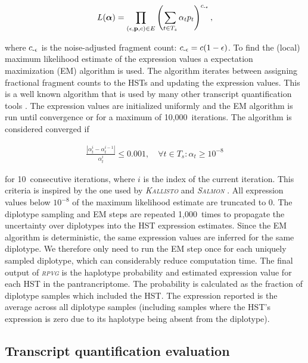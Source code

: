 \documentclass[11pt]{ucthesis}
\newcommand{\tool}[1]{\emph{\textsc{#1}}}
\begin{document}
\begin{align}
    L(\boldsymbol{\alpha})=\prod_{\left(\epsilon, \textbf{p}, c\right) \in E}\left(\sum_{t\in T_s}\alpha_t p_t\right)^{c_{{\text -}\epsilon}},
\end{align}

\noindent where $c_{{\text -}\epsilon}$ is the noise-adjusted fragment count: ${c_{{\text -}\epsilon}=c(1-\epsilon)}$. To find the (local) maximum likelihood estimate of the expression values a expectation maximization (EM) algorithm is used. The algorithm iterates between assigning fractional fragment counts to the HSTs and updating the expression values. This is a well known algorithm that is used by many other transcript quantification tools \cite{li2011rsem,nicolae2011estimation,patro2017salmon,bray2016near}. The expression values are initialized uniformly and the EM algorithm is run until convergence or for a maximum of 10,000~iterations. The algorithm is considered converged if 

\begin{align}
    \frac{\left|\alpha_t^{i}-\alpha_t^{i-1}\right|}{\alpha_t^{i}}\leq0.001,\quad\forall t\in T_s:\alpha_t\geq10^{-8}
\end{align}

\noindent for 10~consecutive iterations, where $i$ is the index of the current iteration. This criteria is inspired by the one used by \tool{Kallisto} \cite{bray2016near} and \tool{Salmon} \cite{patro2017salmon}. All expression values below $10^{-8}$ of the maximum likelihood estimate are truncated to 0. 
The diplotype sampling and EM steps are repeated 1,000~times to propagate the uncertainty over diplotypes into the HST expression estimates. Since the EM algorithm is deterministic, the same expression values are inferred for the same diplotype. We therefore only need to run the EM step once for each uniquely sampled diplotype, which can considerably reduce computation time. 
\newline 
\newline
The final output of \tool{rpvg} is the haplotype probability and estimated expression value for each HST in the pantrancriptome. The probability is calculated as the fraction of diplotype samples which included the HST. The expression reported is the average across all diplotype samples (including samples where the HST's expression is zero due to its haplotype being absent from the diplotype). 

\subsection{Transcript quantification evaluation}
\end{document}
